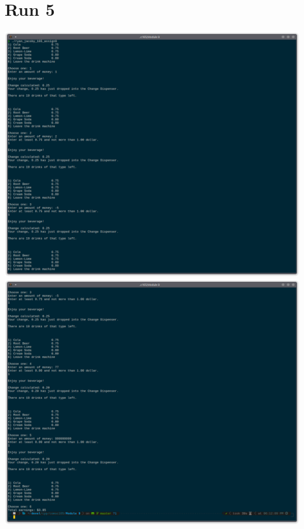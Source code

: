 \documentclass[letterpaper, 11pt]{article}
\begin{document}
\section*{Run 5}
\includegraphics[scale=0.5]{run5_1.png}
\clearpage
\includegraphics[scale=0.5]{run5_2.png}
\clearpage
\end{document}
